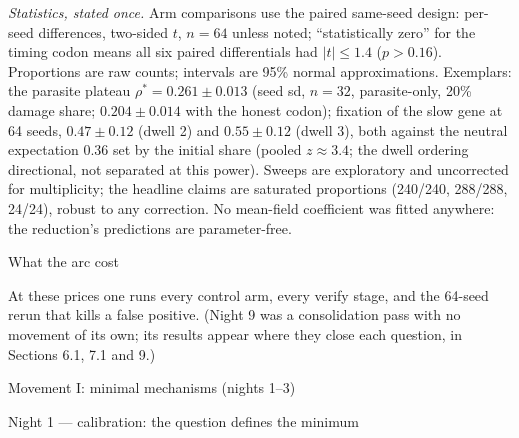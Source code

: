 {\it Statistics, stated once.} Arm comparisons use the paired
same-seed design: per-seed differences, two-sided $t$, $n=64$
unless noted; “statistically zero” for the timing codon means all
six paired differentials had $|t|\le1.4$ ($p>0.16$). Proportions
are raw counts; intervals are 95\% normal approximations.
Exemplars: the parasite plateau $\rho^*=0.261\pm0.013$ (seed sd,
$n=32$, parasite-only, 20\% damage share; $0.204\pm0.014$ with
the honest codon); fixation of the slow gene at 64 seeds,
$0.47\pm0.12$ (dwell 2) and $0.55\pm0.12$ (dwell 3), both
against the neutral expectation 0.36 set by the initial share
(pooled $z\approx3.4$; the dwell ordering directional, not
separated at this power). Sweeps are exploratory and uncorrected
for multiplicity; the headline claims are saturated proportions
(240/240, 288/288, 24/24), robust to any correction. No mean-field
coefficient was fitted anywhere: the reduction's predictions are
parameter-free.

\secc What the arc cost

\medskip
\noindent{}
\medskip

\noindent At these prices one runs every control
arm, every verify stage, and the 64-seed rerun that kills a false
positive. (Night 9 was a consolidation pass with no movement of
its own; its results appear where they close each question, in
Sections 6.1, 7.1 and 9.)

\sec Movement I: minimal mechanisms (nights 1--3)

\secc Night 1 --- calibration: the question defines the minimum

